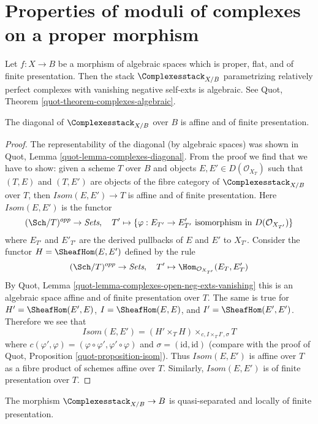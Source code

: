 \section{Properties of moduli of complexes on a proper morphism}
\label{section-complexes}

\noindent
Let $f : X \to B$ be a morphism of algebraic spaces which is proper,
flat, and of finite presentation. Then the stack
$\Complexesstack_{X/B}$ parametrizing relatively perfect complexes
with vanishing negative self-exts is algebraic. See
Quot, Theorem \ref{quot-theorem-complexes-algebraic}.

\begin{lemma}
\label{lemma-complexes-diagonal-affine-fp}
The diagonal of $\Complexesstack_{X/B}$ over $B$ is affine
and of finite presentation.
\end{lemma}

\begin{proof}
The representability of the diagonal (by algebraic spaces)
was shown in Quot, Lemma \ref{quot-lemma-complexes-diagonal}.
From the proof we find that we have to show:
given a scheme $T$ over $B$ and objects
$E, E' \in D(\mathcal{O}_{X_T})$ such that
$(T, E)$ and $(T, E')$ are objects of the fibre category
of $\Complexesstack_{X/B}$ over $T$, then
$\mathit{Isom}(E, E') \to T$
is affine and of finite presentation.
Here $\mathit{Isom}(E, E')$ is the functor
$$
(\Sch/T)^{opp} \to \textit{Sets},\quad
T' \mapsto \{\varphi : E_{T'} \to E'_{T'}
\text{ isomorphism in }D(\mathcal{O}_{X_{T'}})\}
$$
where $E_{T'}$ and $E'_{T'}$ are the derived pullbacks of $E$ and $E'$
to $X_{T'}$. Consider the functor $H = \SheafHom(E, E')$ defined
by the rule
$$
(\Sch/T)^{opp} \to \textit{Sets},\quad
T' \mapsto \Hom_{\mathcal{O}_{X_{T'}}}(E_T, E'_T)
$$
By Quot, Lemma \ref{quot-lemma-complexes-open-neg-exts-vanishing}
this is an algebraic space affine and of finite presentation over $T$.
The same is true for $H' = \SheafHom(E', E)$, $I = \SheafHom(E, E)$, and
$I' = \SheafHom(E', E')$. Therefore we see that
$$
\mathit{Isom}(E, E') = (H' \times_T H) \times_{c, I \times_T I', \sigma} T
$$
where $c(\varphi', \varphi) = (\varphi \circ \varphi', \varphi' \circ \varphi)$
and $\sigma = (\text{id}, \text{id})$ (compare with the proof of
Quot, Proposition \ref{quot-proposition-isom}). Thus
$\mathit{Isom}(E, E')$ is affine over $T$ as a fibre product of
schemes affine over $T$. Similarly, $\mathit{Isom}(E, E')$ is
of finite presentation over $T$.
\end{proof}

\begin{lemma}
\label{lemma-complexes-qs-lfp}
The morphism $\Complexesstack_{X/B} \to B$ is quasi-separated and
locally of finite presentation.
\end{lemma}

